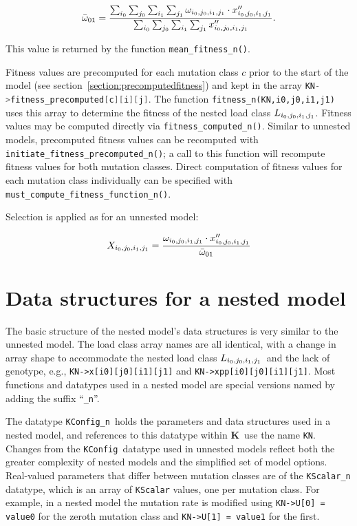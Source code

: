 \documentclass[12pt,twoside,letterpaper,fleqn]{report}
\numberwithin{equation}{section}  %
\newcommand{\K}{{\bf K}}
\newcommand{\KKN}{\mbox{{\tt KN}}}  %
\newcommand{\KConfig}{\mbox{\tt KConfig}}
\newcommand{\KConfign}{\mbox{\tt KConfig\_n}}
\newcommand{\Lijij}{\mbox{$L_{i_0\/,j_0\/,i_1\/,j_1\/}$}}
\newcommand{\wnested}{\mbox{$\omega_{i_0\/,j_0\/,i_1\/,j_1\/}$}}
\newcommand{\meanwnested}{\mbox{$\bar{\omega}_{01}$}}
\newcommand{\xppijij}{\mbox{$x''_{i_0\/,j_0\/,i_1\/,j_1\/}$}}
\newcommand{\Xijij}{\mbox{$X_{i_0\/,j_0\/,i_1\/,j_1\/}$}}
\begin{document}
{\begin{equation}\label{eq:meanfitnessnested}
\meanwnested = \frac{\sum_{i_0}{\sum_{j_0}{\sum_{i_1}{\sum_{j_1}{\wnested\cdot\xppijij}}}}}
               {\sum_{i_0}{\sum_{j_0}{\sum_{i_1}{\sum_{j_1}{\xppijij}}}}}.
\end{equation}

This value is returned by the function \lstinline{mean_fitness_n()}.

Fitness values are precomputed for each mutation class $c$\/ prior to the start
of the model (see section~\ref{section:precomputedfitness}) and kept in the
array \lstinline[language=C]{KN->fitness_precomputed[c][i][j]}.  The function
\lstinline{fitness_n(KN,i0,j0,i1,j1)} uses this array to determine the fitness
of the nested load class \Lijij.  Fitness values may be computed directly via
\lstinline{fitness_computed_n()}.  Similar to unnested models, precomputed
fitness values can be recomputed with
\lstinline{initiate_fitness_precomputed_n()}; a call to this function will
recompute fitness values for both mutation classes.  Direct computation of
fitness values for each mutation class individually can be specified with
\lstinline{must_compute_fitness_function_n()}.

Selection is applied as for an unnested model:

\begin{equation}\label{eq:selectionnested}
\Xijij = \frac{\wnested\cdot\xppijij}{\meanwnested}
\end{equation}

\section{Data structures for a nested model}

The basic structure of the nested model's data structures is very similar to
the unnested model.  The load class array names are all identical, with a
change in array shape to accommodate the nested load class \Lijij\ and the lack
of genotype, e.g., \lstinline{KN->x[i0][j0][i1][j1]} and
\lstinline{KN->xpp[i0][j0][i1][j1]}.  Most functions and datatypes used in a
nested model are special versions named by adding the suffix
``\lstinline{_n}''. 

The datatype \KConfign\ holds the parameters and data structures used in a
nested model, and references to this datatype within \K\ use the name \KKN.
Changes from the \KConfig\ datatype used in unnested models reflect both the
greater complexity of nested models and the simplified set of model options.
Real-valued parameters that differ between mutation classes are of the
\lstinline{KScalar_n} datatype, which is an array of \lstinline{KScalar}
values, one per mutation class.  For example, in a nested model the mutation
rate is modified using \lstinline{KN->U[0] = value0} for the zeroth mutation
class and \lstinline{KN->U[1] = value1} for the first.

}
\end{document}
